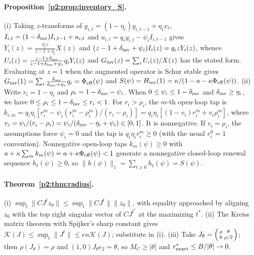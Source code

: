 \paragraph{Proposition~\ref{p2:prop:inventory_S}.} (i) Taking $z$-transforms of $y_{i,t}=(1-\eta_i)y_{i,t-1}+\eta_i x_t$, $I_{i,t}=(1-\delta_{\rm inv})I_{i,t-1}+u_{i,t}$ and $u_{i,t}=q_i y_{i,t}-\psi_i I_{i,t-1}$ gives $Y_i(z)=\frac{\eta_i z}{z-1+\eta_i}X(z)$ and $(z-1+\delta_{\rm inv}+\psi_i)I_i(z)=q_i z Y_i(z)$, whence $U_i(z)=\frac{z-1+\delta_{\rm inv}}{z-1+\delta_{\rm inv}+\psi_i}q_i Y_i(z)$ and $G_{\rm inv}(z)=\sum_i U_i(z)/X(z)$ has the stated form. Evaluating at $z=1$ when the augmented operator is Schur stable gives $G_{\rm inv}(1)=\sum_i \frac{\delta_{\rm inv}}{\delta_{\rm inv}+\psi_i}q_i=\Phi_{\rm eff}(\psi)$ and $S(\psi)=H_{\rm inv}(1)=\kappa/(1-a-\kappa\Phi_{\rm eff}(\psi))$. (ii) Write $r_i=1-\eta_i$ and $\rho_i=1-\delta_{\rm inv}-\psi_i$. When $0\le\psi_i\le 1-\delta_{\rm inv}$ and $\delta_{\rm inv}\ge\eta_i$, we have $0\le\rho_i\le 1-\delta_{\rm inv}\le r_i<1$. For $r_i>\rho_i$, the $m$-th open-loop tap is
$k_{i,m}=q_i\eta_i[r_i^m-\psi_i(r_i^m-\rho_i^m)/(r_i-\rho_i)]
=q_i\eta_i[(1-v_i)r_i^m+v_i\rho_i^m]$, where
$v_i=\psi_i/(r_i-\rho_i)=\psi_i/(\delta_{\rm inv}-\eta_i+\psi_i)\in[0,1]$.
It is nonnegative. If $r_i=\rho_i$, the assumptions force $\psi_i=0$ and the tap is $q_i\eta_i r_i^m\ge0$ (with the usual $r_i^0=1$ convention).
Nonnegative open-loop taps $k_m(\psi)\ge0$ with $a+\kappa\sum_m k_m(\psi)=a+\kappa\Phi_{\rm eff}(\psi)<1$ generate a nonnegative closed-loop renewal sequence $h_t(\psi)\ge0$, so $\|h(\psi)\|_1=\sum_{t\ge0}h_t(\psi)=S(\psi)$.

\paragraph{Theorem~\ref{p2:thm:radius}.} (i) $\sup_t\|CJ^tz_0\|\le\sup_t\|CJ^t\|\|z_0\|$, with equality approached by aligning $z_0$ with the top right singular vector of $CJ^{t^*}$ at the maximizing $t^*$. (ii) The Kreiss matrix theorem with Spijker's sharp constant gives $\mathcal K(J)\le\sup_t\|J^t\|\le en\mathcal K(J)$; substitute in (i). (iii) Take $J_\theta=\begin{psmallmatrix}\rho&\theta\\0&\rho/2\end{psmallmatrix}$; then $\rho(J_\theta)=\rho$ and $(1,0)J_\theta e_2=\theta$, so $M_C\ge|\theta|$ and $r^*_{\rm exact}\le B/|\theta|\to0$.

